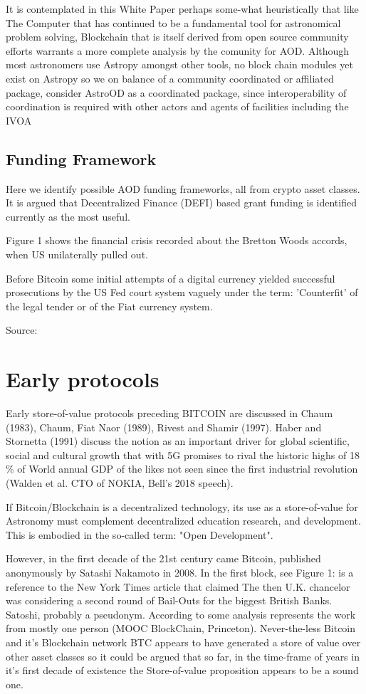 \documentclass[final,5p,times,twocolumn,authoryear]{elsarticle}
\begin{document}
It is contemplated in this White Paper perhaps some-what heuristically that like The Computer that has continued to be a fundamental tool for astronomical problem solving, Blockchain that is itself derived from open source community efforts warrants a more complete analysis by the comunity for AOD. Although most astronomers use Astropy amongst other tools, no block chain modules yet exist on Astropy so we on balance of a community coordinated or affiliated package, consider AstroOD as a coordinated package, since interoperability of coordination is required with other actors and agents of facilities including the IVOA 

\subsection{Funding Framework}

Here we identify possible AOD funding frameworks, all from crypto asset classes.  It is argued that Decentralized Finance (DEFI) based grant funding is identified currently as the most useful.

Figure 1 shows the financial crisis recorded about the Bretton Woods accords, when US unilaterally pulled out.

Before Bitcoin some initial attempts of a digital currency yielded successful prosecutions by the US Fed court system vaguely under the term: 'Counterfit' of the legal tender or of the Fiat currency system. 

Source:  
 
\section{Early protocols}
\label{sec:btc3}

Early store-of-value protocols preceding BITCOIN are discussed in Chaum (1983), Chaum, Fiat Naor (1989), Rivest and Shamir (1997). Haber and Stornetta (1991) discuss the notion as an important driver for global scientific, social and cultural growth that with 5G promises to rival the historic highs of 18 \% of World annual GDP of the likes not seen since the first industrial revolution (Walden et al. CTO of NOKIA, Bell's 2018 speech).

If Bitcoin/Blockchain is a decentralized technology, its use as a store-of-value for Astronomy must complement decentralized education research, and development. This is embodied in the so-called term: "Open Development".

 
However, in the first decade of the 21st century came Bitcoin, published anonymously by Satashi Nakamoto in 2008.  In the first block, see Figure 1: is a reference to the New York Times article that claimed The then U.K. chancelor was considering a second round of Bail-Outs for the biggest British Banks. Satoshi, probably a pseudonym. According to some analysis represents the work from mostly one person (MOOC BlockChain, Princeton). Never-the-less Bitcoin and it's Blockchain network BTC appears to have generated a store of value over other asset classes so it could be argued that so far, in the time-frame of years in it's first decade of existence the Store-of-value proposition appears to be a sound one.
\end{document}
